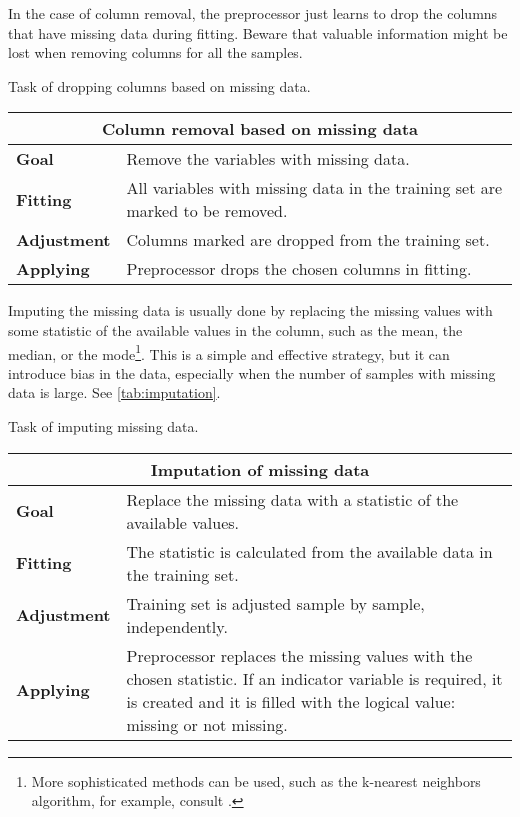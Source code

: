 In the case of column removal, the
preprocessor just learns to drop the columns that have missing data during fitting.
Beware that valuable information might be lost when removing columns for all the samples.

\begin{tablebox}[label=tab:col-drop-missing]{Task of dropping columns based on missing data.}
  \centering
  \begin{tabular}{lp{6cm}}
    \toprule
    \multicolumn{2}{c}{\textbf{Column removal based on missing data}} \\
    \midrule
    \textbf{Goal} &
      Remove the variables with missing data. \\
    \textbf{Fitting} &
      All variables with missing data in the training set are marked to be removed. \\
    \textbf{Adjustment} &
      Columns marked are dropped from the training set. \\
    \textbf{Applying} &
      Preprocessor drops the chosen columns in fitting. \\
    \bottomrule
  \end{tabular}
\end{tablebox}

Imputing the missing data is usually done by replacing the missing values with some
statistic of the available values in the column, such as the mean, the median, or the
mode\footnote{More sophisticated methods can be used, such as the k-nearest neighbors
algorithm, for example, consult .}.  This is a simple and
effective strategy, but it can introduce bias in the data, especially when the number of
samples with missing data is large.  See \cref{tab:imputation}.

\begin{tablebox}[label=tab:imputation]{Task of imputing missing data.}
  \centering
  \begin{tabular}{lp{6cm}}
    \toprule
    \multicolumn{2}{c}{\textbf{Imputation of missing data}} \\
    \midrule
    \textbf{Goal} &
      Replace the missing data with a statistic of the available values. \\
    \textbf{Fitting} &
      The statistic is calculated from the available data in the training set. \\
    \textbf{Adjustment} &
      Training set is adjusted sample by sample, independently. \\
    \textbf{Applying} &
      Preprocessor replaces the missing values with the chosen statistic. If an indicator
      variable is required, it is created and it is filled with the logical value:
      missing or not missing. \\
    \bottomrule
  \end{tabular}
\end{tablebox}

